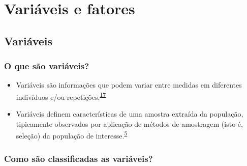 \documentclass[
]{book}
\begin{document}
\hypertarget{variaveis-fatores}{%
\chapter{\texorpdfstring{\textbf{Variáveis e fatores}}{Variáveis e fatores}}\label{variaveis-fatores}}

\hypertarget{variaveis}{%
\section{Variáveis}\label{variaveis}}

\hypertarget{o-que-suxe3o-variuxe1veis}{%
\subsection{O que são variáveis?}\label{o-que-suxe3o-variuxe1veis}}

\begin{itemize}
\item
  Variáveis são informações que podem variar entre medidas em diferentes indivíduos e/ou repetições.\textsuperscript{\protect\hyperlink{ref-Altman1999}{17}}
\item
  Variáveis definem características de uma amostra extraída da população, tipicamente observados por aplicação de métodos de amostragem (isto é, seleção) da população de interesse.\textsuperscript{\protect\hyperlink{ref-vetter2017}{5}}
\end{itemize}

\hypertarget{como-suxe3o-classificadas-as-variuxe1veis}{%
\subsection{Como são classificadas as variáveis?}\label{como-suxe3o-classificadas-as-variuxe1veis}}
\end{document}
